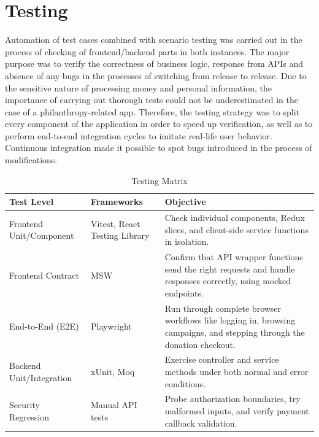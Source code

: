 \documentclass{thesis-library}
\begin{document}
\section{Testing}

Automation of test cases combined with scenario testing was carried out in the process of checking of frontend/backend parts in both instances. The major purpose was to verify the correctness of business logic, response from APIs and absence of any bugs in the processes of switching from release to release. Due to the sensitive nature of processing money and personal information, the importance of carrying out thorough tests could not be underestimated in the case of a philanthropy-related app. Therefore, the testing strategy was to split every component of the application in order to speed up verification, as well as to perform end-to-end integration cycles to imitate real-life user behavior. Continuous integration made it possible to spot bugs introduced in the process of modifications.

\begin{table}[H]
    \centering
    \caption{Testing Matrix}
    \vspace{10pt}
    \begin{tabularx}{\linewidth}{|P{3cm}|P{3.5cm}|L|}
        \hline
        \textbf{Test Level} & \textbf{Frameworks} & \textbf{Objective} \\
        \hline
        Frontend Unit/Component & Vitest, React Testing Library & Check individual components, Redux slices, and client-side service functions in isolation. \\
        \hline
        Frontend Contract & MSW & Confirm that API wrapper functions send the right requests and handle responses correctly, using mocked endpoints. \\
        \hline
        End-to-End (E2E) & Playwright & Run through complete browser workflows like logging in, browsing campaigns, and stepping through the donation checkout. \\
        \hline
        Backend Unit/Integration & xUnit, Moq & Exercise controller and service methods under both normal and error conditions. \\
        \hline
        Security Regression & Manual API tests & Probe authorization boundaries, try malformed inputs, and verify payment callback validation. \\
        \hline
    \end{tabularx}
\end{table}
\end{document}
